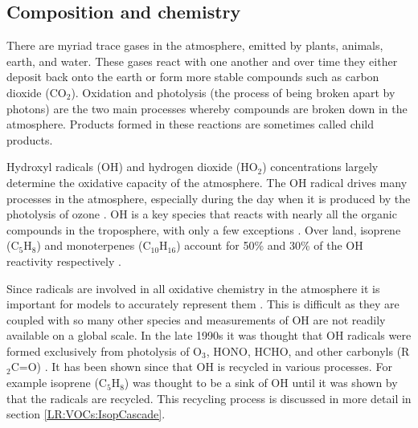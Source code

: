     
  \subsection{Composition and chemistry}
  \label{LR:Atmos:Chem}
        
    There are myriad trace gases in the atmosphere, emitted by plants, animals, 
    earth, and water. 
    These gases react with one another and over time they either deposit back 
    onto the earth or form more stable compounds such as carbon dioxide 
    (CO$_2$).
    Oxidation and photolysis (the process of being broken apart by photons) are the two main processes whereby compounds are broken down in the atmosphere.
    Products formed in these reactions are sometimes called child products.
    
    Hydroxyl radicals (OH$\dot{}$) and hydrogen dioxide (HO$_2$) concentrations 
    largely determine the oxidative capacity of the atmosphere.
    The OH radical drives many processes in the atmosphere, especially during 
    the day when it is produced by the photolysis of ozone \parencite{Atkinson2000}.
    OH is a key species that reacts with nearly all the organic compounds in the troposphere, with only a few exceptions \parencite{Atkinson2000}.
    Over land, isoprene (C$_5$H$_8$) and monoterpenes (C$_{10}$H$_{16}$) account for 50\% and 30\% of the OH reactivity respectively \parencite{Fuentes2000}.
    
    Since radicals are involved in all oxidative chemistry in the atmosphere it 
    is important for models to accurately represent them 
    \parencite[e.g.,][]{Travis2016}.
    This is difficult as they are coupled with so many other species and measurements of OH are not readily available on a global scale.
    In the late 1990s it was thought that OH radicals were formed exclusively 
    from photolysis of O$_3$, HONO, HCHO, and other carbonyls (R$_2$C=O) 
    \parencite{Atkinson2000}.
    It has been shown since that OH is recycled in various processes.
    For example isoprene (C$_5$H$_8$) was thought to be a sink of OH until it 
    was shown by \textcite{Paulot2009b} that the radicals are recycled.
    This recycling process is discussed in more detail in section \ref{LR:VOCs:IsopCascade}.
    
